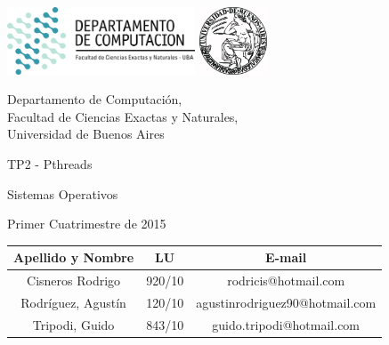 \documentclass[a4paper,10pt,twoside]{article}
\begin{document}


\thispagestyle{caratula}

\begin{center}

\includegraphics[height=2cm]{DC.png} 
\hfill
\includegraphics[height=2cm]{UBA.jpg} 

\vspace{2cm}

Departamento de Computación,\\
Facultad de Ciencias Exactas y Naturales,\\
Universidad de Buenos Aires

\vspace{4cm}

\begin{Huge}
TP2 - Pthreads
\end{Huge}

\vspace{0.5cm}

\begin{Large}
Sistemas Operativos
\end{Large}

\vspace{1cm}

Primer Cuatrimestre de 2015

\vspace{4cm}

\vspace{0.5cm}

\begin{tabular}{|c|c|c|}
\hline
Apellido y Nombre & LU & E-mail\\
\hline
Cisneros Rodrigo		& 920/10 & rodricis@hotmail.com\\
Rodr\'iguez, Agust\'in	& 120/10 & agustinrodriguez90@hotmail.com\\
Tripodi, Guido			& 843/10 & guido.tripodi@hotmail.com\\
\hline
\end{tabular}

\end{center}
\end{document}
